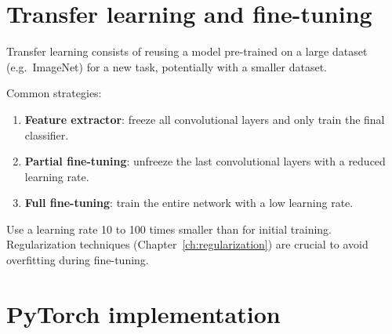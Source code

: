 \section{Transfer learning and fine-tuning}
\label{sec:transfer-learning}

\begin{definition}
Transfer learning consists of reusing a model pre-trained on a large
dataset (e.g.\ ImageNet) for a new task, potentially with a smaller
dataset.
\end{definition}

Common strategies:
\begin{enumerate}
  \item \textbf{Feature extractor}: freeze all convolutional layers and
    only train the final classifier.
  \item \textbf{Partial fine-tuning}: unfreeze the last convolutional
    layers with a reduced learning rate.
  \item \textbf{Full fine-tuning}: train the entire network with a low
    learning rate.
\end{enumerate}

\begin{bestpractice}[title=\textbf{Learning rate for fine-tuning}]
Use a learning rate 10 to 100 times smaller than for initial training.
Regularization techniques (Chapter~\ref{ch:regularization}) are crucial
to avoid overfitting during fine-tuning.
\end{bestpractice}

\section{PyTorch implementation}
\label{sec:cnn-pytorch}

